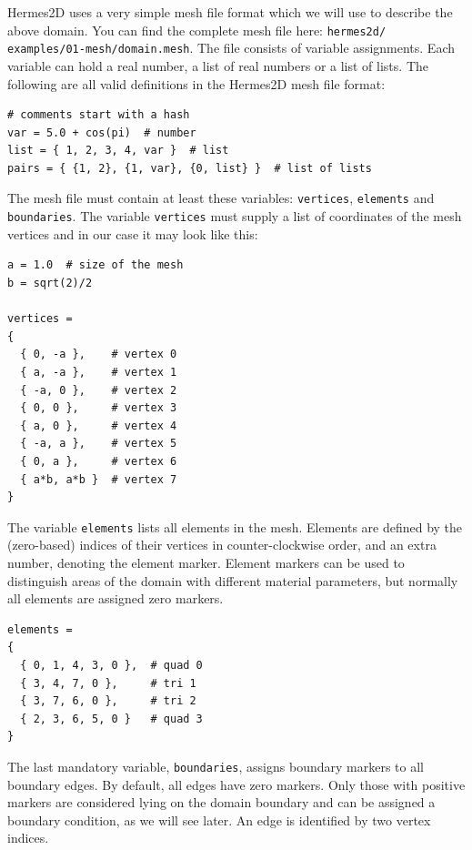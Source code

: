Hermes2D uses a very simple mesh file format which we will use to describe the above
domain. You can find the complete mesh file here: {\tt hermes2d/ examples/01-mesh/domain.mesh}.
The file consists of variable assignments. Each variable can hold a real number,
a list of real numbers or a list of lists. The following are all valid definitions
in the Hermes2D mesh file format:

\lstset{language=make}
\begin{lstlisting}
# comments start with a hash
var = 5.0 + cos(pi)  # number
list = { 1, 2, 3, 4, var }  # list
pairs = { {1, 2}, {1, var}, {0, list} }  # list of lists
\end{lstlisting}

The mesh file must contain at least these variables: {\tt vertices}, {\tt elements} and
{\tt boundaries}. The variable {\tt vertices} must supply a list of coordinates of the
mesh vertices and in our case it may look like this:

\begin{lstlisting}
a = 1.0  # size of the mesh
b = sqrt(2)/2

vertices =
{
  { 0, -a },    # vertex 0
  { a, -a },    # vertex 1
  { -a, 0 },    # vertex 2
  { 0, 0 },     # vertex 3
  { a, 0 },     # vertex 4
  { -a, a },    # vertex 5
  { 0, a },     # vertex 6
  { a*b, a*b }  # vertex 7
}
\end{lstlisting}

The variable {\tt elements} lists all elements in the mesh.
Elements are defined by the (zero-based) indices of their vertices in
counter-clockwise order, and an extra number, denoting the element marker.
Element markers can be used to distinguish areas of the domain with different
material parameters, but normally all elements are assigned zero markers.

\begin{lstlisting}
elements =
{
  { 0, 1, 4, 3, 0 },  # quad 0
  { 3, 4, 7, 0 },     # tri 1
  { 3, 7, 6, 0 },     # tri 2
  { 2, 3, 6, 5, 0 }   # quad 3
}
\end{lstlisting}

The last mandatory variable, {\tt boundaries}, assigns boundary markers to
all boundary edges. By default, all edges have zero markers. Only those with
positive markers are considered lying on the domain boundary and can be
assigned a boundary condition, as we will see later.
An edge is identified by two vertex indices.

